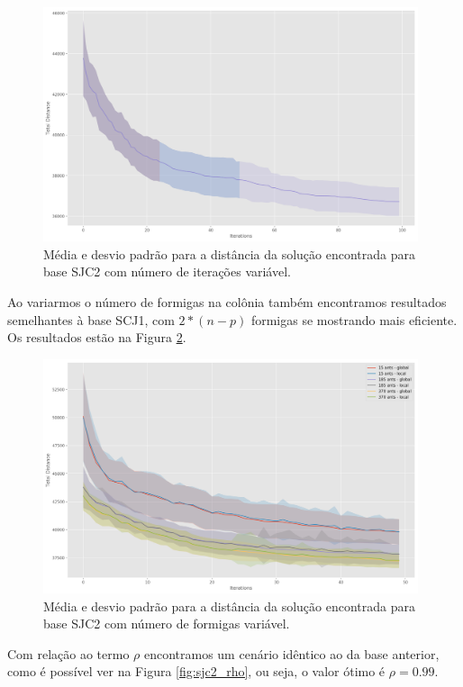 \begin{figure}[h]	
  \centering
  \includegraphics[width=11cm,keepaspectratio]{images/SJC2_iterations.png}
  \caption{Média e desvio padrão para a distância da solução encontrada para base SJC2 com número de iterações variável.}
  \label{fig:sjc2_iterations}
\end{figure}

Ao variarmos o número de formigas na colônia também encontramos resultados semelhantes à base SCJ1, com $2 * (n - p)$ formigas se mostrando mais eficiente. Os resultados estão na Figura \ref{fig:sjc2_ants}.

\begin{figure}[h]	
  \centering
  \includegraphics[width=11cm,keepaspectratio]{images/SJC2_ants.png}
  \caption{Média e desvio padrão para a distância da solução encontrada para base SJC2 com número de formigas variável.}
  \label{fig:sjc2_ants}
\end{figure}

Com relação ao termo $\rho$ encontramos um cenário idêntico ao da base anterior, como é possível ver na Figura \ref{fig:sjc2_rho}, ou seja, o valor ótimo é $\rho = 0.99$. 

